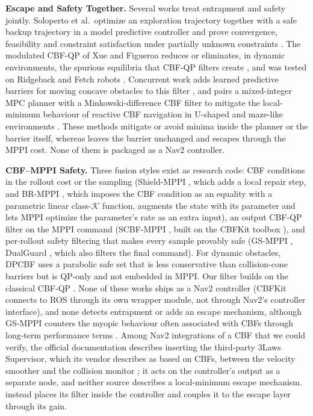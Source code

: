\noindent\textbf{Escape and Safety Together.} Several works treat entrapment and safety jointly. Soloperto et al.\ optimize an exploration trajectory together with a safe backup trajectory in a model predictive controller and prove convergence, feasibility and constraint satisfaction under partially unknown constraints \citep{soloperto}. The modulated CBF-QP of Xue and Figueroa reduces or eliminates, in dynamic environments, the spurious equilibria that CBF-QP filters create \citep{reis_cbf_equilibria}, and was tested on Ridgeback and Fetch robots \citep{mcbf_qp}. Concurrent work adds learned predictive barriers for moving concave obstacles to this filter \citep{xue_proactive}, and pairs a mixed-integer MPC planner with a Minkowski-difference CBF filter to mitigate the local-minimum behaviour of reactive CBF navigation in U-shaped and maze-like environments \citep{chen_milp_cbf}. These methods mitigate or avoid minima inside the planner or the barrier itself, whereas \sname{} leaves the barrier unchanged and escapes through the MPPI cost. None of them is packaged as a Nav2 controller.

\noindent\textbf{CBF--MPPI Safety.} Three fusion styles exist as research code: CBF conditions in the rollout cost or the sampling (Shield-MPPI \citep{shield_mppi}, which adds a local repair step, and BR-MPPI \citep{br_mppi}, which imposes the CBF condition as an equality with a parametric linear class-$\mathcal{K}$ function, augments the state with its parameter and lets MPPI optimize the parameter's rate as an extra input), an output CBF-QP filter on the MPPI command (SCBF-MPPI \citep{scbf_mppi}, built on the CBFKit toolbox \citep{cbfkit}), and per-rollout safety filtering that makes every sample provably safe (GS-MPPI \citep{gs_mppi}, DualGuard \citep{dualguard}, which also filters the final command). For dynamic obstacles, DPCBF \citep{dpcbf} uses a parabolic safe set that is less conservative than collision-cone barriers but is QP-only and not embedded in MPPI. Our filter builds on the classical CBF-QP \citep{ames_cbf_tac,ames_cbf_ecc}. None of these works ships as a Nav2 controller (CBFKit connects to ROS through its own wrapper module, not through Nav2's controller interface), and none detects entrapment or adds an escape mechanism, although GS-MPPI counters the myopic behaviour often associated with CBFs through long-term performance terms \citep{gs_mppi}. Among Nav2 integrations of a CBF that we could verify, the official documentation describes inserting the third-party 3Laws Supervisor, which its vendor describes as based on CBFs, between the velocity smoother and the collision monitor \citep{nav2_3laws,threelaws_pr}; it acts on the controller's output as a separate node, and neither source describes a local-minimum escape mechanism. \sname{} instead places its filter inside the controller and couples it to the escape layer through its gain.

